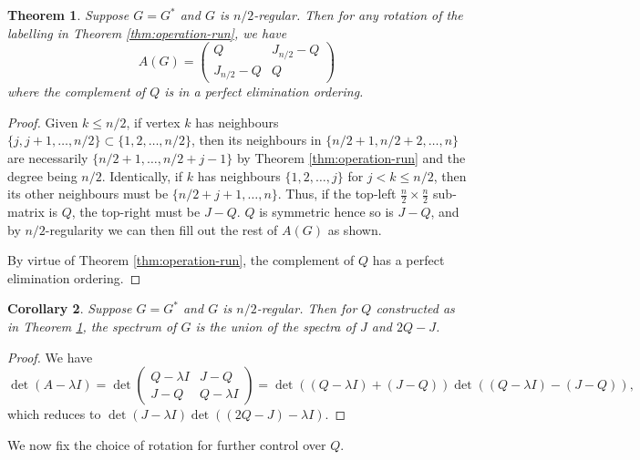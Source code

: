 \documentclass[11pt]{article}
\newtheorem{thm}{Theorem}[section]
\newtheorem{cor}[thm]{Corollary}
\begin{document}
\begin{thm}\label{thm:invariant-symmetry}
    Suppose $G = G^*$ and $G$ is $n/2$-regular. Then for any rotation of the labelling in Theorem \ref{thm:operation-run}, we have
    \[A(G) = \begin{pmatrix}
        Q & J_{n/2} - Q \\
        J_{n/2} - Q & Q
    \end{pmatrix}\]
    where the complement of $Q$ is in a perfect elimination ordering. 
\end{thm}
\begin{proof}
    Given $k \le n/2$, if vertex $k$ has neighbours $\{j, j+1, \dots, n/2\} \subset \{1, 2, \dots, n/2\}$, then its neighbours in $\{n/2+1, n/2+2, \dots, n\}$ are necessarily $\{n/2+1, \dots, n/2+j-1\}$ by Theorem \ref{thm:operation-run} and the degree being $n/2$. Identically, if $k$ has neighbours $\{1, 2, \dots, j\}$ for $j < k \le n/2$, then its other neighbours must be $\{n/2+j+1, \dots, n\}$. Thus, if the top-left $\frac{n}{2} \times \frac{n}{2}$ sub-matrix is $Q$, the top-right must be $J-Q$. $Q$ is symmetric hence so is $J-Q$, and by $n/2$-regularity we can then fill out the rest of $A(G)$ as shown. 

    By virtue of Theorem \ref{thm:operation-run}, the complement of $Q$ has a perfect elimination ordering. 
\end{proof}

\begin{cor}\label{cor:invariant-spectrum}
    Suppose $G = G^*$ and $G$ is $n/2$-regular. Then for $Q$ constructed as in Theorem \ref{thm:invariant-symmetry}, the spectrum of $G$ is the union of the spectra of $J$ and $2Q-J$. 
\end{cor}
\begin{proof}
    We have
    \[\det(A-\lambda I) = \det \begin{pmatrix}
        Q - \lambda I & J - Q \\
        J - Q & Q - \lambda I
    \end{pmatrix} = \det((Q - \lambda I) + (J - Q)) \det((Q - \lambda I) - (J-Q)),\]
    which reduces to $\det(J - \lambda I)\det((2Q-J)-\lambda I)$. 
\end{proof}

We now fix the choice of rotation for further control over $Q$. 
\end{document}
